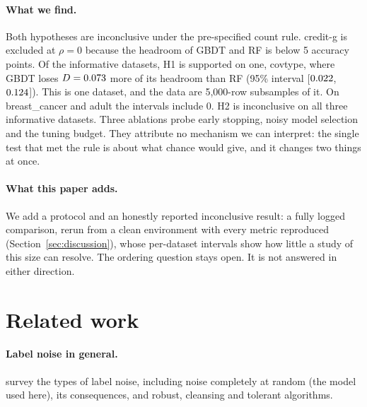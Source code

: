 \documentclass[11pt]{article}
\newcommand{\ds}[1]{\textsf{#1}}
\newcommand{\bc}{\ds{breast\_cancer}}
\newcommand{\cg}{\ds{credit-g}}
\newcommand{\ad}{\ds{adult}}
\newcommand{\ct}{\ds{covtype}}
\begin{document}
\paragraph{What we find.} Both hypotheses are inconclusive under the pre-specified count
rule. \cg{} is excluded at $\rho=0$ because the headroom of GBDT and RF is below 5 accuracy
points. Of the \HOneNInf{} informative datasets, H1 is supported on one, \ct, where
GBDT loses $D=0.073$ more of its headroom than RF (95\% interval
[$0.022$, $0.124$]). This is one dataset, and the data are 5,000-row subsamples of
it. On \bc{} and \ad{} the intervals include 0. H2 is inconclusive on all three informative
datasets. Three ablations probe early stopping, noisy model selection and the tuning budget.
They attribute no mechanism we can interpret: the single test that met the rule is about
what chance would give, and it changes two things at once.

\paragraph{What this paper adds.} We add a protocol and an honestly reported inconclusive result: a fully logged
comparison, rerun from a clean environment with every metric reproduced
(Section~\ref{sec:discussion}), whose per-dataset intervals show how little a study of this size can
resolve. The ordering question stays open. It is not answered in either direction.

\section{Related work}
\label{sec:related}

\paragraph{Label noise in general.} \citet{frenay2014} survey the types of label noise,
including noise completely at random (the model used here), its consequences, and robust,
cleansing and tolerant algorithms.
\end{document}
